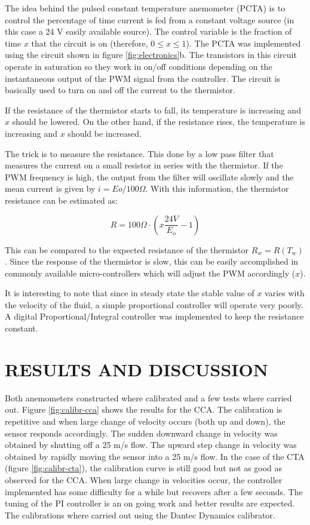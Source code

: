 \documentclass[10pt,fleqn,a4paper,twoside]{article}
\begin{document}
The idea behind the pulsed constant temperature anemometer (PCTA) is to control the percentage of time current is fed from a constant voltage source (in this case a 24 V easily available source). The control variable is the fraction of time $x$ that the circuit is on (therefore, $0 \le x \le 1$). The PCTA was implemented using the circuit shown in figure \ref{fig:electronics}b. The transistors in this circuit operate in saturation so they work in on/off conditions depending on the instantaneous output of the PWM signal from the controller. The circuit is basically used to turn on and off the current to the thermistor.

If the resistance of the thermistor starts to fall, its temperature is increasing and $x$ should be lowered. On the other hand, if the resistance rises, the temperature is increasing and $x$ should be increased.

The trick is to measure the resistance. This done by a low pass filter that measures the current on a small resistor in series with the thermistor. If the PWM frequency is high, the output from the filter will oscillate slowly and the mean current is given by $i = Eo / 100\Omega$. With this information, the thermistor resistance can be estimated as:

\begin{equation}
  R = 100\Omega\cdot\left( x \frac{24V}{E_o} - 1 \right)
  \label{eq:Rt}
\end{equation}

This can be compared to the expected resistance of the thermistor $R_w = R(T_w)$. Since the response of the thermistor is slow, this can be easily accomplished in commonly available micro-controllers which will adjust the PWM accordingly ($x$).

It is interesting to note that since in steady state the stable value of $x$ varies with the velocity of the fluid, a simple proportional controller will operate very poorly. A digital Proportional/Integral controller was implemented to keep the resistance constant.

\section{RESULTS AND DISCUSSION}

Both anemometers constructed where calibrated and a few tests where carried out. Figure \ref{fig:calibr-cca} shows the results for the CCA. The calibration is repetitive and when large change of velocity occurs (both up and down), the sensor responds accordingly. The sudden downward change in velocity was obtained by shutting off a 25 m/s flow. The upward step change in velocity was obtained by rapidly moving the sensor into a 25 m/s flow. In the case of the CTA (figure \ref{fig:calibr-cta}), the calibration curve is still good but not as good as observed for the CCA. When large change in velocities occur, the controller implemented has some difficulty for a while but recovers after a few seconds. The tuning of the PI controller is an on going work and better results are expected. The calibrations where carried out using the Dantec Dynamics calibrator.
\end{document}
